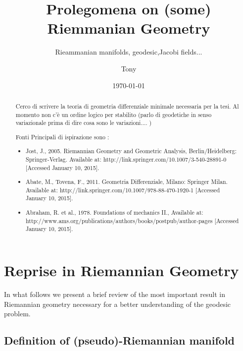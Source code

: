 \documentclass[a4paper,12pt]{scrartcl}    %
\begin{document}
	\title{Prolegomena on (some) Riemmanian Geometry}
	\subtitle{Rieammanian manifolds, geodesic,Jacobi fields...}
	\author{Tony}
	\date{\today}
\maketitle

\begin{abstract}
	Cerco di scrivere la teoria di geometria differenziale minimale necessaria per la tesi.
	Al momento non c'è un ordine logico per stabilito (parlo di geodetiche in senso variazionale prima di dire cosa sono le variazioni.... )
	
	Fonti Principali di ispirazione sono :
	\begin{itemize}
		\item Jost, J., 2005. Riemannian Geometry and Geometric Analysis, Berlin/Heidelberg: Springer-Verlag. Available at: http://link.springer.com/10.1007/3-540-28891-0 [Accessed January 10, 2015].
		\item Abate, M., Tovena, F., 2011. Geometria Differenziale, Milano: Springer Milan. Available at: http://link.springer.com/10.1007/978-88-470-1920-1 [Accessed January 10, 2015].
		\item Abraham, R. et al., 1978. Foundations of mechanics II., Available at: http://www.ams.org/publications/authors/books/postpub/author-pages [Accessed January 10, 2015].
	\end{itemize}
\end{abstract}

\tableofcontents


\newpage

\newpage
\section{Reprise in Riemannian Geometry}
In what follows we present a brief review of the most important result in Riemannian geometry necessary for a better understanding of the geodesic problem.

\subsection{Definition of (pseudo)-Riemannian manifold}
\begin{definition}
\end{definition}
\end{document}
